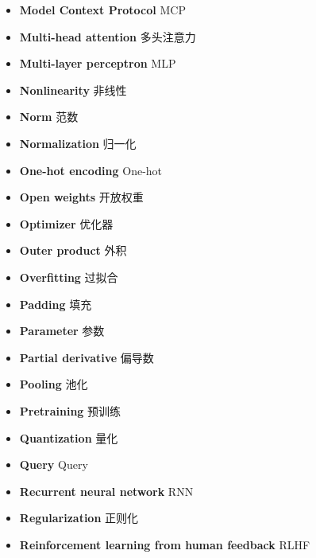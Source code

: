 \begin{itemize}[leftmargin=1.2em,itemsep=2pt,topsep=3pt]
\item {\sffamily\bfseries Model Context Protocol} \quad MCP\quad {}
\item {\sffamily\bfseries Multi-head attention} \quad 多头注意力\quad {}
\item {\sffamily\bfseries Multi-layer perceptron} \quad MLP\quad {}
\item {\sffamily\bfseries Nonlinearity} \quad 非线性\quad {}
\item {\sffamily\bfseries Norm} \quad 范数\quad {}
\item {\sffamily\bfseries Normalization} \quad 归一化\quad {}
\item {\sffamily\bfseries One-hot encoding} \quad One-hot\quad {}
\item {\sffamily\bfseries Open weights} \quad 开放权重\quad {}
\item {\sffamily\bfseries Optimizer} \quad 优化器\quad {}
\item {\sffamily\bfseries Outer product} \quad 外积\quad {}
\item {\sffamily\bfseries Overfitting} \quad 过拟合\quad {}
\item {\sffamily\bfseries Padding} \quad 填充\quad {}
\item {\sffamily\bfseries Parameter} \quad 参数\quad {}
\item {\sffamily\bfseries Partial derivative} \quad 偏导数\quad {}
\item {\sffamily\bfseries Pooling} \quad 池化\quad {}
\item {\sffamily\bfseries Pretraining} \quad 预训练\quad {}
\item {\sffamily\bfseries Quantization} \quad 量化\quad {}
\item {\sffamily\bfseries Query} \quad Query\quad {}
\item {\sffamily\bfseries Recurrent neural network} \quad RNN\quad {}
\item {\sffamily\bfseries Regularization} \quad 正则化\quad {}
\item {\sffamily\bfseries Reinforcement learning from human feedback} \quad RLHF\quad {}

\end{itemize}
